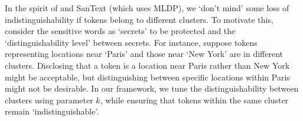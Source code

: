 In the  spirit of \cite{chatzikokolakis2013broadening} and SanText (which uses MLDP), we `don’t mind' some loss of indistinguishability if tokens belong to different clusters. To motivate this, consider the sensitive words as `secrets' to be protected and the `distinguishability level' between secrets. For instance, suppose tokens representing locations near `Paris'  and those near `New York' are in different clusters. Disclosing that a token is a location near Paris rather than  New York might be acceptable, but distinguishing between specific locations within Paris might not be desirable. 
In our framework, we tune the distinguishability between clusters using parameter $k$, while ensuring that tokens within the same cluster remain `indistinguishable'.





